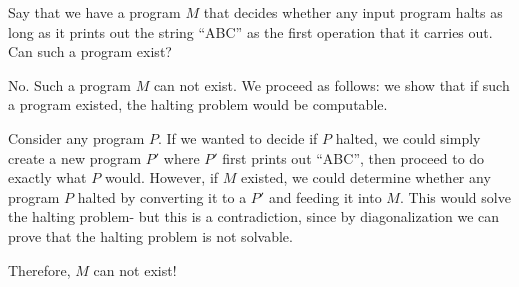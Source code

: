 \question Say that we have a program $M$ that decides whether any input 
program halts as long as it prints out the string “ABC” as the first 
operation that it carries out. Can such a program exist? 
\begin{solution}
No. Such a program $M$ can not exist. We proceed as follows: we show 
that if such a program existed, the halting problem would be computable.

Consider any program $P$. If we wanted to decide if $P$ halted, we 
could simply create a new program $P'$ where $P'$ first prints out “ABC”, 
then proceed to do exactly what $P$ would. However, if $M$ existed, we 
could determine whether any program $P$ halted by converting it to a $P'$ 
and feeding it into $M$. This would solve the halting problem- but this 
is a contradiction, since by diagonalization we can prove that the 
halting problem is not solvable.

Therefore, $M$ can not exist!  
\end{solution}